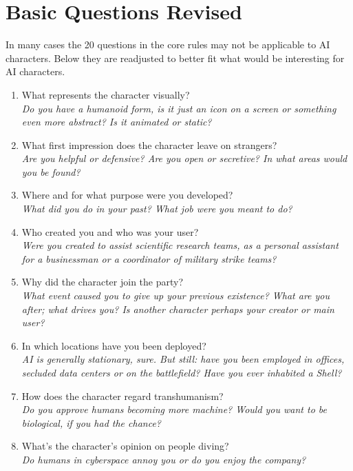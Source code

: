 \documentclass[12pt,a4paper,openany]{book}
\begin{document}
	\section{Basic Questions Revised}
	In many cases the 20 questions in the core rules may not be applicable to AI characters. Below they are readjusted to better fit what would be interesting for AI characters.
	\begin{multicols}{2}
	\begin{enumerate}
		\setlength\itemsep{-6mm}
		\item What represents the character visually?\\
		\textit{Do you have a humanoid form, is it just an icon on a screen or something even more abstract? Is it animated or static?}
		\item What first impression does the character leave on strangers?\\
		\textit{Are you helpful or defensive? Are you open or secretive? In what areas would you be found?}
		\item Where and for what purpose were you developed?\\
		\textit{What did you do in your past? What job were you meant to do?}
		\item Who created you and who was your user?\\
		\textit{Were you created to assist scientific research teams, as a personal assistant for a businessman or a coordinator of military strike teams?}
		\item Why did the character join the party?\\
		\textit{What event caused you to give up your previous existence? What are you after; what drives you? Is another character perhaps your creator or main user?}
		\item In which locations have you been deployed?\\
		\textit{AI is generally stationary, sure. But still: have you been employed in offices, secluded data centers or on the battlefield? Have you ever inhabited a Shell?}
		\item How does the character regard transhumanism?\\
		\textit{Do you approve humans becoming more machine? Would you want to be biological, if you had the chance?}
		\item What’s the character’s opinion on people diving?\\
		\textit{Do humans in cyberspace annoy you or do you enjoy the company?}

\end{enumerate}
\end{multicols}
\end{document}
